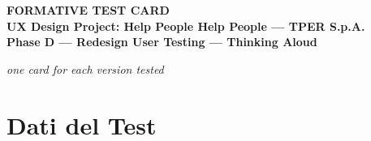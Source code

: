 \documentclass[11pt,a4paper]{article}
\begin{document}
\begin{tcolorbox}[colback=primaryColor,colframe=primaryColor,arc=3mm,halign=center,valign=center,height=2.5cm]
  \color{white}\LARGE\bfseries FORMATIVE TEST CARD \\[0.2cm]
  \color{white!80}\large UX Design Project: Help People Help People --- TPER S.p.A. \\[0.1cm]
  \color{white!60}\normalsize Phase D --- Redesign User Testing --- Thinking Aloud
\end{tcolorbox}

\vspace{0.2cm}

\begin{center}
\small\emph{one card for each version tested}
\end{center}

\vspace{0.3cm}

\section{Dati del Test}
\end{document}
